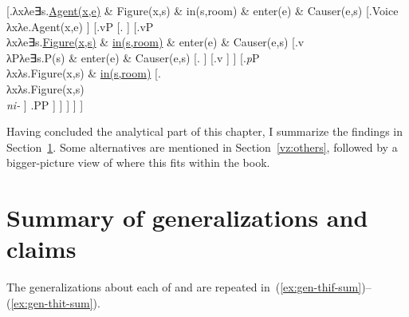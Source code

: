 \begin{exe}
\begin{xlist}
\begin{xlist}
\begin{exe}
\begin{xlist}
\begin{xlist}
\begin{exe}
\begin{xlist}
\begin{xlist}
\begin{exe}
\begin{exe}
\begin{xlist}
\begin{exe}
\begin{exe}
\begin{xlist}
\begin{exe}
\begin{exe}
\begin{exe}
\begin{exe}
\begin{exe}
\begin{xlist}
\begin{exe}
\begin{xlist}
\begin{exe}
\begin{exe}
\begin{xlist}
\begin{exe}
\begin{xlist}
\begin{exe}
\begin{exe}
\begin{exe}
\begin{xlist}
\begin{exe}
\begin{exe}
\begin{exe}
\begin{xlist}
\begin{exe}
\begin{xlist}
\begin{exe}
\begin{xlist}
\begin{exe}
\begin{xlist}
\begin{exe}
\begin{exe}
\begin{exe}
\begin{exe}
\begin{xlist}
\begin{exe}
\begin{xlist}
\begin{exe}
\begin{xlist}
\begin{exe}
\begin{xlist}
\begin{exe}
\begin{xlist}
\begin{exe}
\begin{xlist}
\begin{exe}
\begin{exe}
\begin{exe}
\begin{exe}
\begin{xlist}
\begin{exe}
\begin{xlist}
\begin{exe}
\begin{xlist}
\begin{exe}
\begin{exe}
\begin{xlist}
\begin{exe}
\begin{exe}
\begin{exe}
\begin{exe}
\begin{xlist}
\begin{xlist}
\begin{exe}
\begin{xlist}
\begin{exe}
\begin{exe}
\begin{exe}
\begin{xlist}
\begin{exe}
\begin{exe}
\begin{xlist}
\begin{exe}
\begin{exe}
\begin{exe}
\begin{xlist}
\begin{xlist}
\begin{exe}
\begin{xlist}
\begin{exe}
\begin{exe}
\begin{exe}
\begin{exe}
\begin{xlist}
\begin{exe}
\begin{xlist}
\begin{exe}
\begin{xlist}
\begin{exe}
\begin{exe}
\begin{exe}
\begin{exe}
\begin{exe}
\begin{exe}
\begin{xlist}
\begin{exe}
\begin{xlist}
\begin{exe}
\begin{xlist}
{{      [.{λxλe∃s.\underline{Agent(x,e)} \& Figure(x,s) \& in(s,room) \& enter(e) \& Causer(e,s)}
           [.{Voice\\ λxλe.Agent(x,e)} ]
			[.vP
				[.{\va} ]
	           [.{vP\\ λxλe∃s.\underline{Figure(x,s)} \& \underline{in(s,room)} \& enter(e) \& Causer(e,s)}
	              [.{v\\ λPλe∃s.P(s) \& enter(e) \& Causer(e,s)}
		             [. ]
		             [.v ]
	              ]
	              [.{\emph{p}P\\ λxλs.Figure(x,s) \& \underline{in(s,room)}}
	                  [.{\pz\\ λxλs.Figure(x,s)\\ \emph{ni-}} ]
	                  .PP
	              ]
	          ]
	        ]
       ]
    ]
}
}


Having concluded the analytical part of this chapter, I summarize the findings in Section~\ref{vz:sum}. Some alternatives are mentioned in Section~\ref{vz:others}, followed by a bigger-picture view of where this fits within the book.


\section{Summary of generalizations and claims} \label{vz:sum}
The generalizations about each of {\tnif} and {\thit} are repeated in~(\ref{ex:gen-thif-sum})--(\ref{ex:gen-thit-sum}).
\end{xlist}
\end{exe}
\end{xlist}
\end{exe}
\end{xlist}
\end{exe}
\end{exe}
\end{exe}
\end{exe}
\end{exe}
\end{exe}
\end{xlist}
\end{exe}
\end{xlist}
\end{exe}
\end{xlist}
\end{exe}
\end{exe}
\end{exe}
\end{exe}
\end{xlist}
\end{exe}
\end{xlist}
\end{xlist}
\end{exe}
\end{exe}
\end{exe}
\end{xlist}
\end{exe}
\end{exe}
\end{xlist}
\end{exe}
\end{exe}
\end{exe}
\end{xlist}
\end{exe}
\end{xlist}
\end{xlist}
\end{exe}
\end{exe}
\end{exe}
\end{exe}
\end{xlist}
\end{exe}
\end{exe}
\end{xlist}
\end{exe}
\end{xlist}
\end{exe}
\end{xlist}
\end{exe}
\end{exe}
\end{exe}
\end{exe}
\end{xlist}
\end{exe}
\end{xlist}
\end{exe}
\end{xlist}
\end{exe}
\end{xlist}
\end{exe}
\end{xlist}
\end{exe}
\end{xlist}
\end{exe}
\end{exe}
\end{exe}
\end{exe}
\end{xlist}
\end{exe}
\end{xlist}
\end{exe}
\end{xlist}
\end{exe}
\end{xlist}
\end{exe}
\end{exe}
\end{exe}
\end{xlist}
\end{exe}
\end{exe}
\end{exe}
\end{xlist}
\end{exe}
\end{xlist}
\end{exe}
\end{exe}
\end{xlist}
\end{exe}
\end{xlist}
\end{exe}
\end{exe}
\end{exe}
\end{exe}
\end{exe}
\end{xlist}
\end{exe}
\end{exe}
\end{xlist}
\end{exe}
\end{exe}
\end{xlist}
\end{xlist}
\end{exe}
\end{xlist}
\end{xlist}
\end{exe}
\end{xlist}
\end{xlist}
\end{exe}
